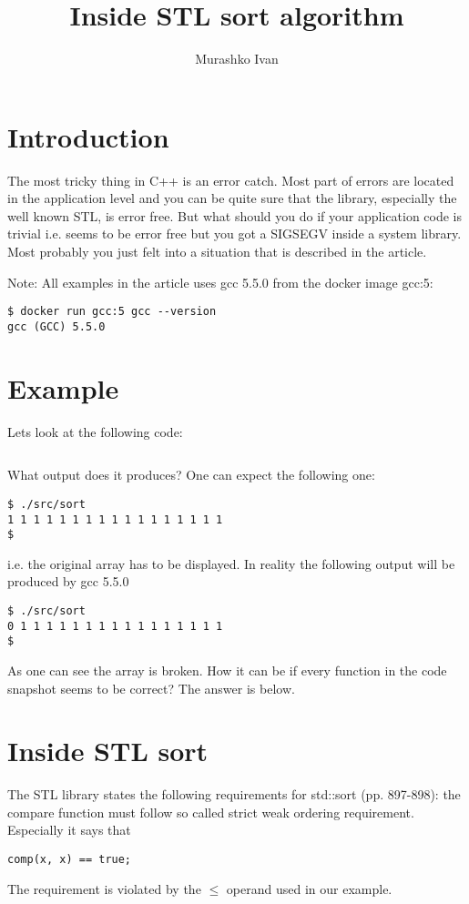 \documentclass[14pt,a4paper]{article}
\title{Inside STL sort algorithm}
\author{Murashko Ivan}
\date{}
\begin{document}
\maketitle

\section*{Introduction}
The most tricky thing in C++ is an error catch. Most part of errors
are located in the application level and you can be quite sure that
the library, especially the well known STL, is error free. But what
should you do if your application code is trivial i.e. seems to be
error free but you got a SIGSEGV inside a system library. Most
probably you just felt into a situation that is described in the
article. 

Note: All examples in the article uses gcc 5.5.0 from the docker image
gcc:5: 
\begin{verbatim}
$ docker run gcc:5 gcc --version
gcc (GCC) 5.5.0
\end{verbatim}


\section{Example}
Lets look at the following code:
\inputminted{c++}{./src/sort.cpp}
What output does it produces? One can expect the following one:
\begin{verbatim}
$ ./src/sort
1 1 1 1 1 1 1 1 1 1 1 1 1 1 1 1 1
$
\end{verbatim}
i.e. the original array has to be displayed. In reality the following
output will be produced by gcc 5.5.0 
\begin{verbatim}
$ ./src/sort
0 1 1 1 1 1 1 1 1 1 1 1 1 1 1 1 1
$
\end{verbatim}
As one can see the array is broken. How it can be if every
function in the code snapshot seems to be correct? The answer is
below. 

\section{Inside STL sort}

The STL library states the following requirements for std::sort 
\cite{ISO:2013:IIP}(pp. 897-898): the compare function must follow so
called strict weak ordering requirement. Especially it
says that 
\begin{verbatim}
comp(x, x) == true;
\end{verbatim}
The requirement is violated
by the $\le$ operand used in our example.  
\end{document}

